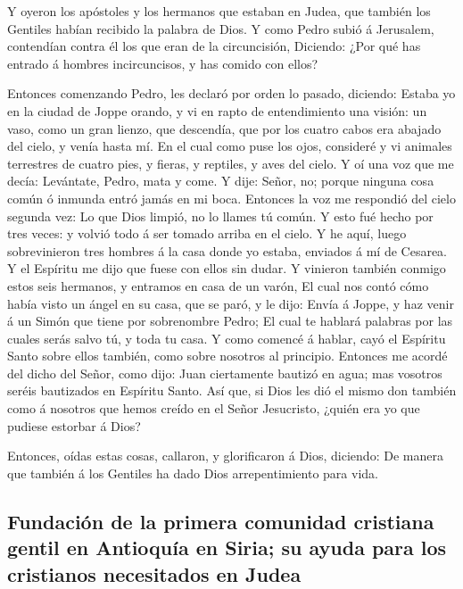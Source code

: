  Y oyeron los apóstoles y los hermanos que estaban en Judea,
que también los Gentiles habían recibido la palabra de Dios.
 Y como Pedro subió á Jerusalem, contendían contra él los
que eran de la circuncisión,  Diciendo: ¿Por qué has entrado
á hombres incircuncisos, y has comido con ellos?

 Entonces comenzando Pedro, les declaró por orden lo pasado,
diciendo:  Estaba yo en la ciudad de Joppe orando, y vi en
rapto de entendimiento una visión: un vaso, como un gran lienzo, que
descendía, que por los cuatro cabos era abajado del cielo, y venía hasta
mí.  En el cual como puse los ojos, consideré y vi animales
terrestres de cuatro pies, y fieras, y reptiles, y aves del cielo.
 Y oí una voz que me decía: Levántate, Pedro, mata y come.
 Y dije: Señor, no; porque ninguna cosa común ó inmunda
entró jamás en mi boca.  Entonces la voz me respondió del
cielo segunda vez: Lo que Dios limpió, no lo llames tú común.
 Y esto fué hecho por tres veces: y volvió todo á ser
tomado arriba en el cielo.  Y he aquí, luego sobrevinieron
tres hombres á la casa donde yo estaba, enviados á mí de Cesarea.
 Y el Espíritu me dijo que fuese con ellos sin dudar. Y
vinieron también conmigo estos seis hermanos, y entramos en casa de un
varón,  El cual nos contó cómo había visto un ángel en su
casa, que se paró, y le dijo: Envía á Joppe, y haz venir á un Simón que
tiene por sobrenombre Pedro;  El cual te hablará palabras
por las cuales serás salvo tú, y toda tu casa.  Y como
comencé á hablar, cayó el Espíritu Santo sobre ellos también, como sobre
nosotros al principio.  Entonces me acordé del dicho del
Señor, como dijo: Juan ciertamente bautizó en agua; mas vosotros seréis
bautizados en Espíritu Santo.  Así que, si Dios les dió el
mismo don también como á nosotros que hemos creído en el Señor
Jesucristo, ¿quién era yo que pudiese estorbar á Dios?

 Entonces, oídas estas cosas, callaron, y glorificaron á
Dios, diciendo: De manera que también á los Gentiles ha dado Dios
arrepentimiento para vida.

\hypertarget{fundaciuxf3n-de-la-primera-comunidad-cristiana-gentil-en-antioquuxeda-en-siria-su-ayuda-para-los-cristianos-necesitados-en-judea}{%
\subsection{Fundación de la primera comunidad cristiana gentil en
Antioquía en Siria; su ayuda para los cristianos necesitados en
Judea}\label{fundaciuxf3n-de-la-primera-comunidad-cristiana-gentil-en-antioquuxeda-en-siria-su-ayuda-para-los-cristianos-necesitados-en-judea}}

